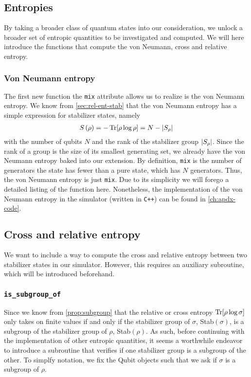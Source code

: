 \subsection{Entropies}
By taking a broader class of quantum states into our consideration, we unlock a
broader set of entropic quantities to be investigated and computed. We will
here introduce the functions that compute the von Neumann, cross and relative
entropy.
\subsubsection{Von Neumann entropy}
The first new function the \verb|mix| attribute allows us to realize is the von
Neumann entropy. We know from \cref{sec:rel-ent-stab} that the von Neumann
entropy has a simple expression for stabilizer states, namely
\begin{align}
  S\left( \rho \right) = -\Tr[\rho\log\rho] = N - \abs{S_\rho}
\end{align}
with the number of qubits $N$ and the rank of the stabilizer group
$\abs{S_\rho}$. Since the rank of a group is the size of its smallest
generating set, we already have the von Neumann entropy baked into our
extension. By definition, \verb|mix| is the number of generators the state has
fewer than a pure state, which has $N$ generators. Thus, the von Neumann
entropy is just \verb|mix|. Due to its simplicity we will forego a detailed
listing of the function here. Nonetheless, the implementation of the von
Neumann entropy in the simulator (written in \verb|C++|) can be found in
\cref{ch:apdx-code}.

\subsection{Cross and relative entropy}
We want to include a way to compute the cross and relative entropy between two
stabilizer states in our simulator. However, this requires an auxiliary
subroutine, which will be introduced beforehand.

\subsubsection{\texttt{is\_subgroup\_of}}
Since we know from \cref{prop:subgroup} that the relative or cross
entropy $\Tr[\rho\log\sigma]$ only takes on finite values if and only if the
stabilizer group of $\sigma$, Stab$(\sigma)$, is a subgroup of the stabilizer group
of $\rho$, Stab$(\rho)$. As such, before continuing with the implementation of
other entropic quantities, it seems a worthwhile endeavor to introduce a
subroutine that verifies if one stabilizer group is a subgroup of the other.
To simplfy notation, we fix the Qubit objects such that we ask if $\sigma$ is a
subgroup of $\rho$.

